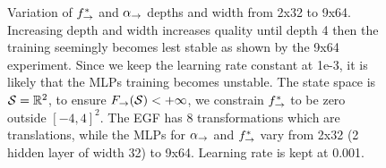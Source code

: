 \documentclass{article}
\theoremstyle{plain}
\theoremstyle{definition}
\theoremstyle{remark}
\theoremstyle{fact}
\begin{document}
\begin{figure}
    \caption{Variation of $f^*_{\rightarrow}$ and $\alpha_{\rightarrow}$ depths and width from 2x32 to 9x64. Increasing depth and width increases quality until depth 4 then the training seemingly becomes lest stable as shown by the 9x64 experiment. Since we keep the learning rate constant at 1e-3, it is likely that the MLPs training becomes unstable.
    The state space is $\mathcal S = \mathbb R^2$,  to ensure $F_{\rightarrow}(\mathcal S)<+\infty$, we constrain $f^*_{\rightarrow}$ to be zero outside $[-4,4]^2$. 
The EGF has 8 transformations which are translations, while the MLPs for $\alpha_{\rightarrow}$ and $f^*_{\rightarrow}$ vary from 2x32 (2 hidden layer of width 32) to 9x64. Learning rate is kept at 0.001.
    }
    \label{fig:toyimg}
\end{figure}
\end{document}

